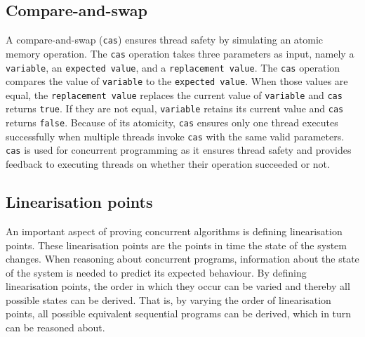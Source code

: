 \documentclass{sig-alternate-br}
\begin{document}
\subsection{Compare-and-swap}
A compare-and-swap (\texttt{cas}) ensures thread safety by simulating an atomic memory operation.
The \texttt{cas} operation takes three parameters as input, namely a \texttt{variable}, an \texttt{expected value}, and a \texttt{replacement value}.
The \texttt{cas} operation compares the value of \texttt{variable} to the \texttt{expected value}. When those values are equal, the \texttt{replacement value} replaces the current value of \texttt{variable} and \texttt{cas} returns \texttt{true}.
If they are not equal, \texttt{variable} retains its current value and \texttt{cas} returns \texttt{false}.
Because of its atomicity, \texttt{cas} ensures only one thread executes successfully when multiple threads invoke \texttt{cas} with the same valid parameters.
\texttt{cas} is used for concurrent programming as it ensures thread safety and provides feedback to executing threads on whether their operation succeeded or not.

\subsection{Linearisation points}
\label{sec:lin}
An important aspect of proving concurrent algorithms is defining linearisation points\cite{herlihy1990}.
These linearisation points are the points in time the state of the system changes.
When reasoning about concurrent programs, information about the state of the system is needed to predict its expected behaviour.
By defining linearisation points, the order in which they occur can be varied and thereby all possible states can be derived.
That is, by varying the order of linearisation points, all possible equivalent sequential programs can be derived, which in turn can be reasoned about.
\end{document}
